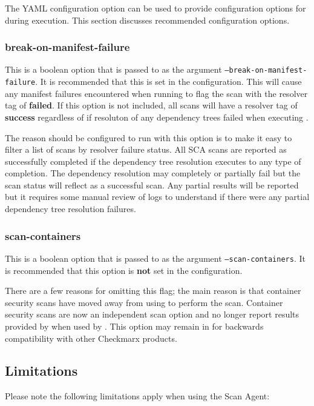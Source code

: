 The YAML configuration option  can be used to provide
configuration options for \scaresolver during execution.  This section discusses recommended
configuration options.

\subsubsection{break-on-manifest-failure}\label{sec:break-manifest}

This is a boolean option that is passed to \scaresolver as the argument \texttt{--break-on-manifest-failure}.  It is recommended
that this is set in the  configuration.  This will cause any manifest failures
encountered when running \scaresolver to flag the scan with the resolver tag of \textbf{failed}.  If this option is not included,
all scans will have a resolver tag of \textbf{success} regardless of if resoluton of any dependency trees failed when
executing \scaresolverns.

The reason \scaresolver should be configured to run with this option is to make it easy to filter a list of scans by resolver
failure status.  All SCA scans are reported as successfully completed if the dependency tree resolution executes to
any type of completion.  The dependency resolution may completely or partially fail but the scan status will reflect
as a successful scan.  Any partial results will be reported but it requires some manual review of logs to understand if there
were any partial dependency tree resolution failures.

\subsubsection{scan-containers}
This is a boolean option that is passed to \scaresolver as the argument \texttt{--scan-containers}.  It is recommended that
this option is \textbf{not} set in the  configuration.

There are a few reasons for omitting this flag; the main reason is that container security scans have moved away from
using \scaresolver to perform the scan.  Container security scans are now an independent scan option and no longer
report results provided by \scaresolver when used by \cxonens.  This option may remain in \scaresolver for backwards
compatibility with other Checkmarx products.

\subsection{Limitations}
Please note the following limitations apply when using the Scan Agent:

